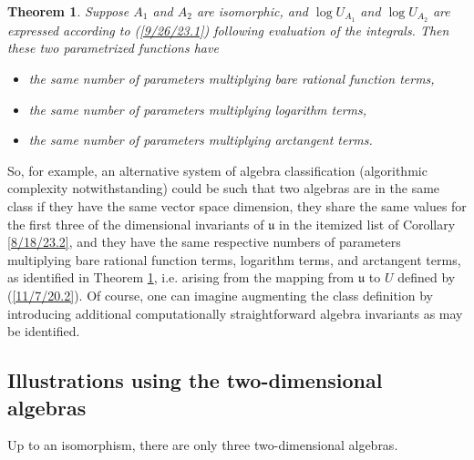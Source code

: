 \documentclass{amsart}
\numberwithin{equation}{section}
\newtheorem{theorem}{Theorem}
\theoremstyle{definition}
\numberwithin{theorem}{section}
\begin{document}
\begin{theorem} \label{6/6/23.3} Suppose $A_1$ and $A_2$ are isomorphic, and $\log U_{A_1}$ and $\log U_{A_2}$ are expressed according to (\ref{9/26/23.1}) following evaluation of the integrals.  Then these two parametrized functions have
\begin{itemize}\item   the same number of parameters multiplying bare rational function terms, \item  the same number of parameters multiplying logarithm terms,  \item  the same number of parameters multiplying arctangent terms.\end{itemize}
\end{theorem}

So, for example, an alternative system of algebra classification (algorithmic complexity notwithstanding) could be such that two algebras are in the same class if they have the same vector space dimension, they share the same values for the first three of the dimensional invariants of $\mathfrak{u}$ in the itemized list of Corollary \ref{8/18/23.2}, and they have the same respective numbers of parameters multiplying bare rational function terms, logarithm terms, and arctangent terms, as identified in Theorem \ref{6/6/23.3}, i.e. arising from the mapping from $\mathfrak{u}$ to $ U$ defined by (\ref{11/7/20.2}).  
Of course, one can imagine augmenting the class definition by introducing additional computationally straightforward algebra invariants as may be identified.  

\subsection{Illustrations using the two-dimensional algebras}
Up to an isomorphism, there are only three two-dimensional algebras.
\end{document}
